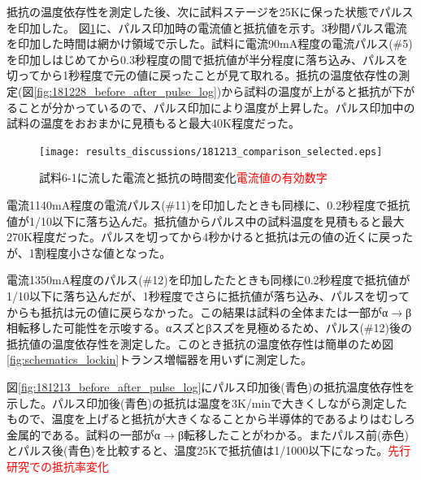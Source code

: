 抵抗の温度依存性を測定した後、次に試料ステージを25Kに保った状態でパルスを印加した。
図\ref{fig:181213_comparison_selected}に、パルス印加時の電流値と抵抗値を示す。3秒間パルス電流を印加した時間は網かけ領域で示した。試料に電流90mA程度の電流パルス(\#5)を印加しはじめてから0.3秒程度の間で抵抗値が半分程度に落ち込み、パルスを切ってから1秒程度で元の値に戻ったことが見て取れる。抵抗の温度依存性の測定(図\ref{fig:181228_before_after_pulse_log})から試料の温度が上がると抵抗が下がることが分かっているので、パルス印加により温度が上昇した。パルス印加中の試料の温度をおおまかに見積もると最大40K程度だった。
  \begin{figure}[!h]
    \begin{center}
   \texttt{[image: results\_discussions/181213\_comparison\_selected.eps]}
  \end{center}
  \caption{試料6-1に流した電流と抵抗の時間変化\textcolor{red}{電流値の有効数字}}
  \label{fig:181213_comparison_selected}
  \end{figure}

電流1140mA程度の電流パルス(\#11)を印加したときも同様に、0.2秒程度で抵抗値が1/10以下に落ち込んだ。抵抗値からパルス中の試料温度を見積もると最大270K程度だった。パルスを切ってから4秒かけると抵抗は元の値の近くに戻ったが、1割程度小さな値となった。

電流1350mA程度のパルス(\#12)を印加したたときも同様に0.2秒程度で抵抗値が1/10以下に落ち込んだが、1秒程度でさらに抵抗値が落ち込み、パルスを切ってからも抵抗は元の値に戻らなかった。この結果は試料の全体または一部がα$\to$β相転移した可能性を示唆する。αスズとβスズを見極めるため、パルス(\#12)後の抵抗値の温度依存性を測定した。このとき抵抗の温度依存性は簡単のため図\ref{fig:schematics_lockin}トランス増幅器を用いずに測定した。

図\ref{fig:181213_before_after_pulse_log}にパルス印加後(青色)の抵抗温度依存性を示した。パルス印加後(青色)の抵抗は温度を3K/minで大きくしながら測定したもので、温度を上げると抵抗が大きくなることから半導体的であるよりはむしろ金属的である。試料の一部がα$\to$β転移したことがわかる。またパルス前(赤色)とパルス後(青色)を比較すると、温度25Kで抵抗値は1/1000以下になった。\textcolor{red}{先行研究での抵抗率変化}

